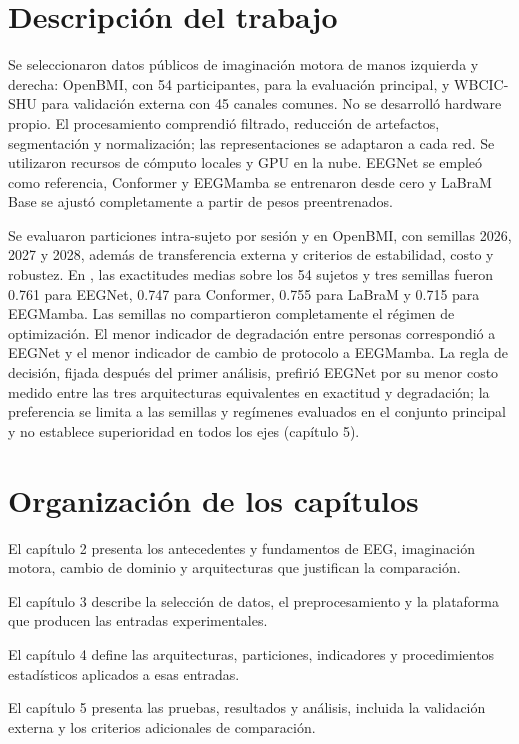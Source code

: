 \section{Descripción del trabajo}
Se seleccionaron datos públicos de imaginación motora de manos izquierda y derecha: OpenBMI, con 54 participantes, para la evaluación principal, y WBCIC-SHU para validación externa con 45 canales comunes. No se desarrolló hardware propio. El procesamiento comprendió filtrado, reducción de artefactos, segmentación y normalización; las representaciones se adaptaron a cada red. Se utilizaron recursos de cómputo locales y GPU en la nube. EEGNet se empleó como referencia, Conformer y EEGMamba se entrenaron desde cero y LaBraM Base se ajustó completamente a partir de pesos preentrenados.

Se evaluaron particiones intra-sujeto por sesión y \loso{} en OpenBMI, con semillas 2026, 2027 y 2028, además de transferencia externa y criterios de estabilidad, costo y robustez. En \loso{}, las exactitudes medias sobre los 54 sujetos y tres semillas fueron 0.761 para EEGNet, 0.747 para Conformer, 0.755 para LaBraM y 0.715 para EEGMamba. Las semillas no compartieron completamente el régimen de optimización. El menor indicador de degradación entre personas correspondió a EEGNet y el menor indicador de cambio de protocolo a EEGMamba. La regla de decisión, fijada después del primer análisis, prefirió EEGNet por su menor costo medido entre las tres arquitecturas equivalentes en exactitud \loso{} y degradación; la preferencia se limita a las semillas y regímenes evaluados en el conjunto principal y no establece superioridad en todos los ejes (capítulo 5).

\section{Organización de los capítulos}
El capítulo 2 presenta los antecedentes y fundamentos de EEG, imaginación motora, cambio de dominio y arquitecturas que justifican la comparación.

El capítulo 3 describe la selección de datos, el preprocesamiento y la plataforma que producen las entradas experimentales.

El capítulo 4 define las arquitecturas, particiones, indicadores y procedimientos estadísticos aplicados a esas entradas.

El capítulo 5 presenta las pruebas, resultados y análisis, incluida la validación externa y los criterios adicionales de comparación.

